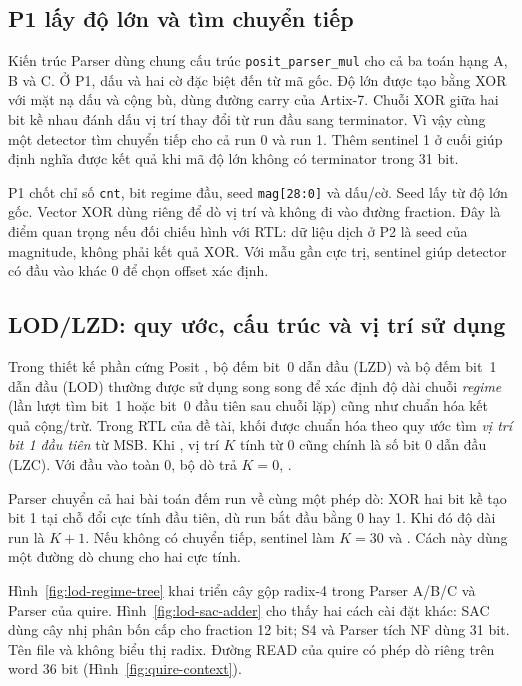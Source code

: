 \subsection{P1 lấy độ lớn và tìm chuyển tiếp}

Kiến trúc Parser dùng chung cấu trúc \texttt{posit\_parser\_mul} cho cả ba toán hạng A, B và C.
Ở P1, dấu và hai cờ đặc biệt đến từ mã gốc. Độ lớn được tạo bằng
XOR với mặt nạ dấu và cộng bù, dùng đường carry của Artix-7.
Chuỗi XOR giữa hai bit kề nhau đánh dấu vị trí thay đổi từ run
đầu sang terminator. Vì vậy cùng một detector tìm chuyển tiếp
cho cả run 0 và run 1. Thêm sentinel 1 ở cuối giúp định nghĩa
được kết quả khi mã độ lớn không có terminator trong 31 bit.



P1 chốt chỉ số \texttt{cnt}, bit regime đầu, seed \texttt{mag[28:0]}
và dấu/cờ. Seed lấy từ độ lớn gốc. Vector XOR dùng riêng để dò
vị trí và không đi vào đường fraction. Đây là điểm quan trọng nếu
đối chiếu hình với RTL: dữ liệu dịch ở P2 là seed của magnitude,
không phải kết quả XOR. Với mẫu gần cực trị, sentinel giúp detector
có đầu vào khác 0 để chọn offset xác định.

\subsection{LOD/LZD: quy ước, cấu trúc và vị trí sử dụng}

Trong thiết kế phần cứng Posit \cite{jaiswal2018posit,murillo2020flopoco}, bộ đếm
bit~0 dẫn đầu (LZD) và bộ đếm bit~1 dẫn đầu (LOD) thường được sử dụng song song
để xác định độ dài chuỗi \textit{regime} (lần lượt tìm bit~1 hoặc bit~0 đầu
tiên sau chuỗi lặp) cũng như chuẩn hóa kết quả cộng/trừ. Trong RTL của đề tài,
khối  được chuẩn hóa theo quy ước tìm \emph{vị trí bit 1 đầu tiên} từ MSB.
Khi , vị trí $K$ tính từ 0 cũng chính là số bit 0 dẫn đầu
(LZC). Với đầu vào toàn 0, bộ dò trả $K=0$, .

Parser chuyển cả hai bài toán đếm run về cùng một phép dò:
XOR hai bit kề tạo bit 1 tại chỗ đổi cực tính đầu tiên, dù
run bắt đầu bằng 0 hay 1. Khi đó độ dài run là $K+1$.
Nếu không có chuyển tiếp, sentinel làm $K=30$ và
. Cách này dùng một đường dò chung cho hai cực tính.

Hình~\ref{fig:lod-regime-tree} khai triển cây gộp radix-4 trong
Parser A/B/C và Parser của quire. Hình~\ref{fig:lod-sac-adder}
cho thấy hai cách cài đặt khác: SAC dùng cây nhị phân bốn cấp
cho fraction 12 bit; S4 và Parser tích NF dùng  31 bit.
Tên file  và 
không biểu thị radix. Đường READ của quire có phép dò riêng trên
word 36 bit (Hình~\ref{fig:quire-context}).

